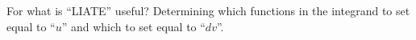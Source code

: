 {For what is ``LIATE'' useful?}
{Determining which functions in the integrand to set equal to ``$u$'' and which to set equal to ``$dv$''.
}

